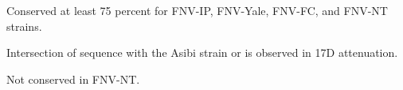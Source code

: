 \documentclass{report}
\begin{document}
%	
		\begin{ThreePartTable}


		
		\begin{tablenotes}
			\item[a]Conserved at least 75 percent for FNV-IP, FNV-Yale, FNV-FC, and FNV-NT strains.
			\item[b]Intersection of sequence with the Asibi strain or is observed in 17D attenuation.
			\item[c]Not conserved in FNV-NT.
		\end{tablenotes}
		\end{ThreePartTable}
		\label{my-label}
\end{document}
